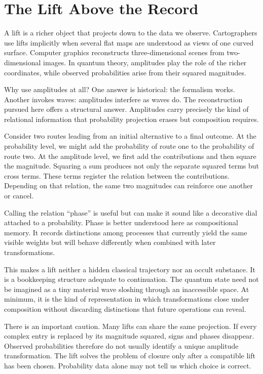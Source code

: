 \documentclass[12pt,openany]{book}
\begin{document}
\chapter{The Lift Above the Record}
A lift is a richer object that projects down to the data we observe. Cartographers use lifts implicitly when several flat maps are understood as views of one curved surface. Computer graphics reconstructs three-dimensional scenes from two-dimensional images. In quantum theory, amplitudes play the role of the richer coordinates, while observed probabilities arise from their squared magnitudes.

Why use amplitudes at all? One answer is historical: the formalism works. Another invokes waves: amplitudes interfere as waves do. The reconstruction pursued here offers a structural answer. Amplitudes carry precisely the kind of relational information that probability projection erases but composition requires.

Consider two routes leading from an initial alternative to a final outcome. At the probability level, we might add the probability of route one to the probability of route two. At the amplitude level, we first add the contributions and then square the magnitude. Squaring a sum produces not only the separate squared terms but cross terms. These terms register the relation between the contributions. Depending on that relation, the same two magnitudes can reinforce one another or cancel.

Calling the relation ``phase'' is useful but can make it sound like a decorative dial attached to a probability. Phase is better understood here as compositional memory. It records distinctions among processes that currently yield the same visible weights but will behave differently when combined with later transformations.

This makes a lift neither a hidden classical trajectory nor an occult substance. It is a bookkeeping structure adequate to continuation. The quantum state need not be imagined as a tiny material wave sloshing through an inaccessible space. At minimum, it is the kind of representation in which transformations close under composition without discarding distinctions that future operations can reveal.

There is an important caution. Many lifts can share the same projection. If every complex entry is replaced by its magnitude squared, signs and phases disappear. Observed probabilities therefore do not usually identify a unique amplitude transformation. The lift solves the problem of closure only after a compatible lift has been chosen. Probability data alone may not tell us which choice is correct.
\end{document}
